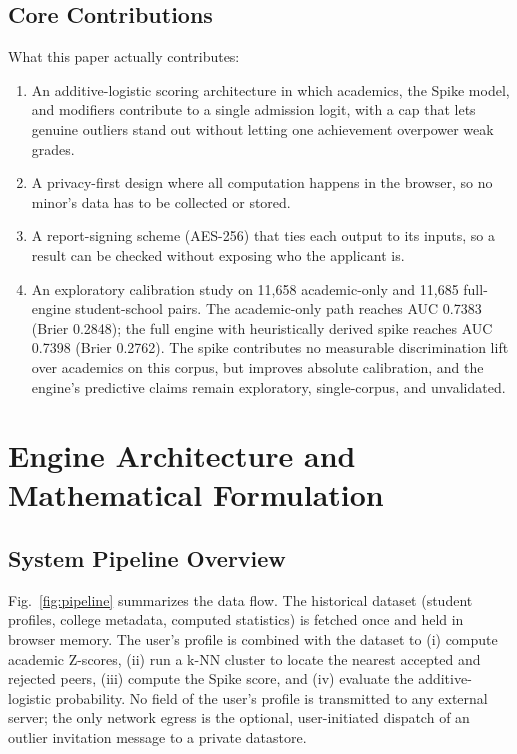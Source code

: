 \documentclass[conference]{IEEEtran}
\begin{document}
\subsection{Core Contributions}
What this paper actually contributes:
\begin{enumerate}
    \item An additive-logistic scoring architecture in which academics, the Spike model, and modifiers contribute to a single admission logit, with a cap that lets genuine outliers stand out without letting one achievement overpower weak grades.
    \item A privacy-first design where all computation happens in the browser, so no minor's data has to be collected or stored.
    \item A report-signing scheme (AES-256) that ties each output to its inputs, so a result can be checked without exposing who the applicant is.
    \item An exploratory calibration study on 11,658 academic-only and 11,685 full-engine student-school pairs. The academic-only path reaches AUC 0.7383 (Brier 0.2848); the full engine with heuristically derived spike reaches AUC 0.7398 (Brier 0.2762). The spike contributes no measurable discrimination lift over academics on this corpus, but improves absolute calibration, and the engine's predictive claims remain exploratory, single-corpus, and unvalidated.
\end{enumerate}

\section{Engine Architecture and Mathematical Formulation}
\subsection{System Pipeline Overview}
Fig.~\ref{fig:pipeline} summarizes the data flow. The historical dataset (student profiles, college metadata, computed statistics) is fetched once and held in browser memory. The user's profile is combined with the dataset to (i) compute academic Z-scores, (ii) run a k-NN cluster to locate the nearest accepted and rejected peers, (iii) compute the Spike score, and (iv) evaluate the additive-logistic probability. No field of the user's profile is transmitted to any external server; the only network egress is the optional, user-initiated dispatch of an outlier invitation message to a private datastore.
\end{document}
